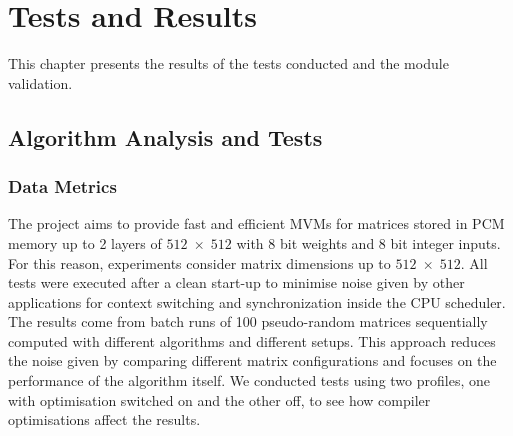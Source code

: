 \chapter{Tests and Results}\label{chap:test}
This chapter presents the results of the tests conducted and the module validation.

\section{Algorithm Analysis and Tests}\label{sec:alg_anal}

\subsection{Data Metrics}\label{sec:bench}
The project aims to provide fast and efficient MVMs for matrices stored in PCM memory up to 2 layers of $512\;\times\;512$ with $8$ bit weights and $8$ bit integer inputs.
For this reason, experiments consider matrix dimensions up to $512\;\times\;512$.
All tests were executed after a clean start-up to minimise noise given by other applications for context switching and synchronization inside the CPU scheduler.
The results come from batch runs of 100 pseudo-random matrices sequentially computed with different algorithms and different setups.
This approach reduces the noise given by comparing different matrix configurations and focuses on the performance of the algorithm itself.
We conducted tests using two profiles, one with optimisation switched on and the other off, to see how compiler optimisations affect the results.

